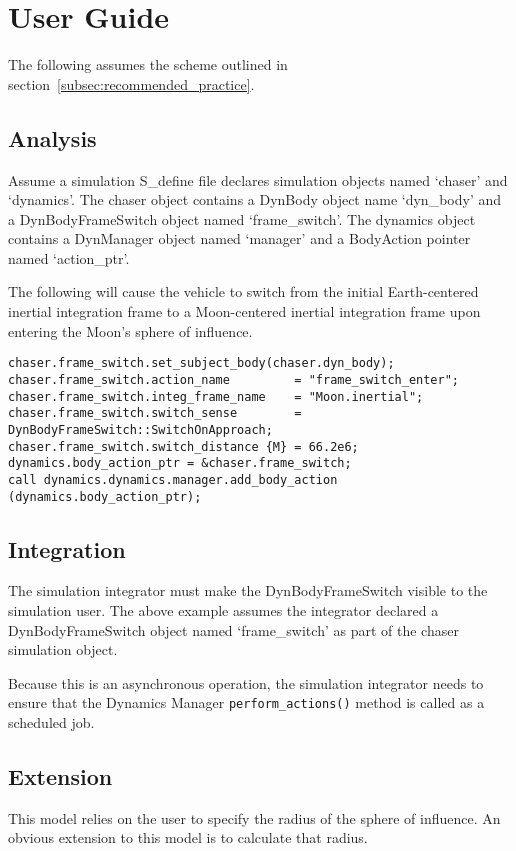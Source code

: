 %

\chapter{User Guide}\label{ch:\modelpartid:user}
The following assumes the scheme outlined in
section~\ref{subsec:recommended_practice}.

\section{Analysis}

Assume a simulation S\_define file declares simulation objects
named `chaser' and `dynamics'. The chaser object contains
a DynBody object name `dyn\_body' and
a DynBodyFrameSwitch object named `frame\_switch'. The dynamics object
contains a DynManager object named `manager' and a BodyAction pointer
named `action\_ptr'.

The following will cause the vehicle to switch from the initial Earth-centered
inertial integration frame to a Moon-centered inertial integration frame upon
entering the Moon's sphere of influence.

\begin{verbatim}
chaser.frame_switch.set_subject_body(chaser.dyn_body);
chaser.frame_switch.action_name         = "frame_switch_enter";
chaser.frame_switch.integ_frame_name    = "Moon.inertial";
chaser.frame_switch.switch_sense        = DynBodyFrameSwitch::SwitchOnApproach;
chaser.frame_switch.switch_distance {M} = 66.2e6;
dynamics.body_action_ptr = &chaser.frame_switch;
call dynamics.dynamics.manager.add_body_action (dynamics.body_action_ptr);
\end{verbatim}

\section{Integration}
The simulation integrator must make the DynBodyFrameSwitch visible to
the simulation user. The above example assumes the integrator declared
a DynBodyFrameSwitch object named `frame\_switch' as part of the chaser
simulation object.

Because this is an asynchronous operation, the simulation integrator needs
to ensure that the Dynamics Manager {\tt perform\_actions()} method is called
as a scheduled job.

\section{Extension}
This model relies on the user to specify the radius of the sphere of influence.
An obvious extension to this model is to calculate that radius.

